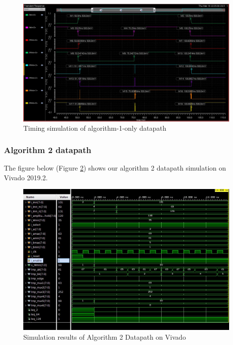 \documentclass[letterpaper, 11pt]{article}
\begin{document}
	\begin{figure}[htb!]
		\centering
		\includegraphics[width=0.85\linewidth]{report_pics/algorithm1_sim_delay.JPG}
		\caption{Timing simulation of algorithm-1-only datapath}
		\label{fig41}
	\end{figure}
	
	
	\subsubsection{Algorithm 2 datapath}
	\label{subsubsec:algorithm1}
	
	The figure below (Figure \ref{fig42}) shows our algorithm 2 datapath simulation on Vivado 2019.2.
	
	\begin{figure}[htb!]
		\centering
		\includegraphics[width=0.85\linewidth]{report_pics/datapath_algo2_vivado.jpg}
		\caption{Simulation results of Algorithm 2 Datapath on Vivado}
		\label{fig42}
	\end{figure}
	
	\newpage
\end{document}
